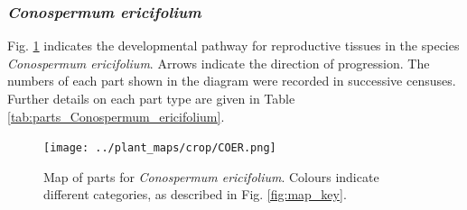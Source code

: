 \documentclass[10pt,twoside]{article}\usepackage[]{graphicx}\usepackage[]{color}
\begin{document}
\clearpage

\subsubsection{\emph{Conospermum ericifolium}}

Fig. \ref{fig:map_Conospermum_ericifolium} indicates the developmental pathway for reproductive tissues in the species \emph{Conospermum ericifolium}. Arrows indicate the direction of progression.  The numbers of each part shown in the diagram were recorded in successive censuses. Further details on each part type are given in Table \ref{tab:parts_Conospermum_ericifolium}.

\begin{figure}[h]
\centering
\texttt{[image: ../plant\_maps/crop/COER.png]}
\caption{Map of parts for \emph{Conospermum ericifolium}. Colours indicate different categories, as described in Fig. \ref{fig:map_key}.}
\label{fig:map_Conospermum_ericifolium}
\end{figure}
\end{document}
